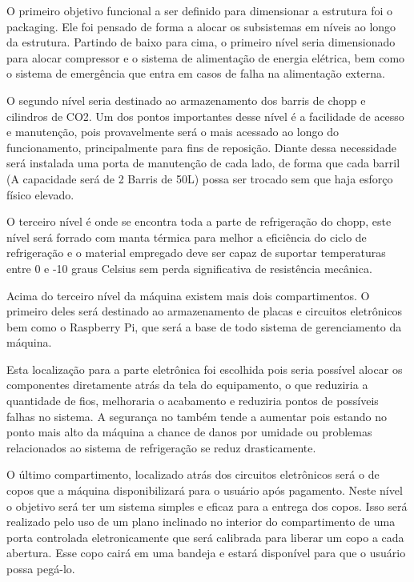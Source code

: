 				O primeiro objetivo funcional a ser definido para dimensionar a estrutura foi o packaging. Ele foi pensado de forma a alocar os subsistemas em níveis ao longo da estrutura. Partindo de baixo para cima, o primeiro nível seria dimensionado para alocar compressor e o sistema de alimentação de energia elétrica, bem como o sistema de emergência que entra em casos de falha na alimentação externa.
				
				O segundo nível seria destinado ao armazenamento dos barris de chopp e cilindros de CO2. Um dos pontos importantes desse nível é a facilidade de acesso e manutenção, pois provavelmente será o mais acessado ao longo do funcionamento, principalmente para fins de reposição. Diante dessa necessidade será instalada uma porta de manutenção de cada lado, de forma que cada barril (A capacidade será de 2 Barris de 50L) possa ser trocado sem que haja esforço físico elevado.
				
				O terceiro nível é onde se encontra toda a parte de refrigeração do chopp, este nível será forrado com manta térmica para melhor a eficiência do ciclo de refrigeração e o material empregado deve ser capaz de suportar temperaturas entre 0 e -10 graus Celsius sem perda significativa de resistência mecânica.
				
				Acima do terceiro nível da máquina existem mais dois compartimentos. O primeiro deles será destinado ao armazenamento de placas e circuitos eletrônicos bem como o Raspberry Pi, que será a base de todo sistema de gerenciamento da máquina.
				
				Esta localização para a parte eletrônica foi escolhida pois seria possível alocar os componentes diretamente atrás da tela do equipamento, o que reduziria a quantidade de fios, melhoraria o acabamento e reduziria pontos de possíveis falhas no sistema. A segurança no também tende a aumentar pois estando no ponto mais alto da máquina a chance de danos por umidade ou problemas relacionados ao sistema de refrigeração se reduz drasticamente.
				
				O último compartimento, localizado atrás dos circuitos eletrônicos será o de copos que a máquina disponibilizará para o usuário após pagamento. Neste nível o objetivo será ter um sistema simples e eficaz para a entrega dos copos. Isso será realizado pelo uso de um plano inclinado no interior do compartimento de uma porta controlada eletronicamente que será calibrada para liberar um copo a cada abertura. Esse copo cairá em uma bandeja e estará disponível para que o usuário possa pegá-lo.
				
